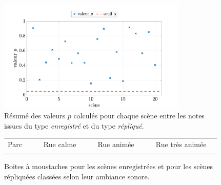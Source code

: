\begin{figure}[ht]
\centering
\includegraphics[width = 0.8\textwidth]{./figures/test_perceptif/t-value-student.pdf}
\caption{Résumé des valeurs $p$ calculés pour chaque scène entre les notes issues du type \textit{enregistré} et du type \textit{répliqué}.}\label{fig:test-student}
\end{figure}

\begin{figure}[ht]
\centering
{}

\begin{tabular}{|p{1.5cm}|l|p{0.001cm}|p{2cm}|l|p{0.001cm}|p{2cm}|l|p{0.001cm}|p{2.75cm}|l|}
\hhline{|-|-|~|-|-|~|-|-|~|-|-|}
Parc & {\cellcolor[HTML]{5AB25A}} & & Rue calme & {\cellcolor[HTML]{FFCB2F}} & & Rue animée & {\cellcolor[HTML]{F56B00}} & &  Rue très animée & {\cellcolor[HTML]{9A0000}}\\
\hhline{|-|-|~|-|-|~|-|-|~|-|-|}
\end{tabular}

\caption{Boites à moustaches pour les scènes enregistrées   et pour les scènes répliquées  classées selon leur ambiance sonore.}

\label{fig:boxplot_scene}
\end{figure}

